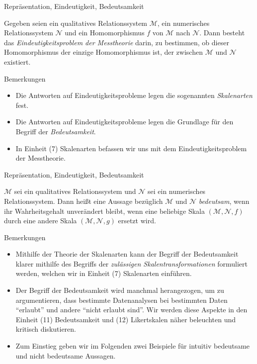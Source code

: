 \documentclass[
  8pt,
  ignorenonframetext,
]{beamer}
\providecommand{\tightlist}{%
  \setlength{\itemsep}{0pt}\setlength{\parskip}{0pt}}
\begin{document}
\begin{frame}{Repräsentation, Eindeutigkeit, Bedeutsamkeit}
\protect\hypertarget{repruxe4sentation-eindeutigkeit-bedeutsamkeit-2}{}
\small
\begin{definition}
\justifying
Gegeben seien ein qualitatives Relationssystem $\mathcal{M}$, ein numerisches 
Relationssystem $\mathcal{N}$ und ein Homomorphismus $f$ von $\mathcal{M}$ nach $\mathcal{N}$.
Dann besteht das \textit{Eindeutigkeitsproblem der Messtheorie} darin, zu bestimmen, 
ob dieser Homomorphismus der einzige Homomorphismus ist, der zwischen $\mathcal{M}$ 
und $\mathcal{N}$ existiert.
\end{definition}

\footnotesize

Bemerkungen

\begin{itemize}
\tightlist
\item
  \justifying Die Antworten auf Eindeutigkeitsprobleme legen die
  sogenannten \emph{Skalenarten} fest.
\item
  Die Antworten auf Eindeutigkeitsprobleme legen die Grundlage für den
  Begriff der \emph{Bedeutsamkeit}.
\item
  In Einheit (7) Skalenarten befassen wir uns mit dem
  Eindeutigkeitsproblem der Messtheorie.
\end{itemize}
\end{frame}

\begin{frame}{Repräsentation, Eindeutigkeit, Bedeutsamkeit}
\protect\hypertarget{repruxe4sentation-eindeutigkeit-bedeutsamkeit-3}{}
\small
\begin{definition}[Bedeutsamkeit]
\justifying
$\mathcal{M}$ sei ein qualitatives Relationssystem und $\mathcal{N}$ sei ein
numerisches Relationssystem. Dann heißt eine Aussage bezüglich $\mathcal{M}$ und 
$\mathcal{N}$ \textit{bedeutsam}, wenn ihr Wahrheitsgehalt unverändert bleibt, wenn eine
beliebige Skala $(\mathcal{M},\mathcal{N},f)$ durch eine andere Skala
$(\mathcal{M}, \mathcal{N},g)$ ersetzt wird.
\end{definition}

\footnotesize

Bemerkungen

\begin{itemize}
\tightlist
\item
  \justifying Mithilfe der Theorie der Skalenarten kann der Begriff der
  Bedeutsamkeit klarer mithilfe des Begriffs der \emph{zulässigen
  Skalentransformationen} formuliert werden, welchen wir in Einheit (7)
  Skalenarten einführen.
\item
  Der Begriff der Bedeutsamkeit wird manchmal herangezogen, um zu
  argumentieren, dass bestimmte Datenanalysen bei bestimmten Daten
  ``erlaubt'' und andere ``nicht erlaubt sind''. Wir werden diese
  Aspekte in den Einheit (11) Bedeutsamkeit und (12) Likertskalen näher
  beleuchten und kritisch diskutieren.
\item
  Zum Einstieg geben wir im Folgenden zwei Beispiele für intuitiv
  bedeutsame und nicht bedeutsame Aussagen.
\end{itemize}
\end{frame}
\end{document}
